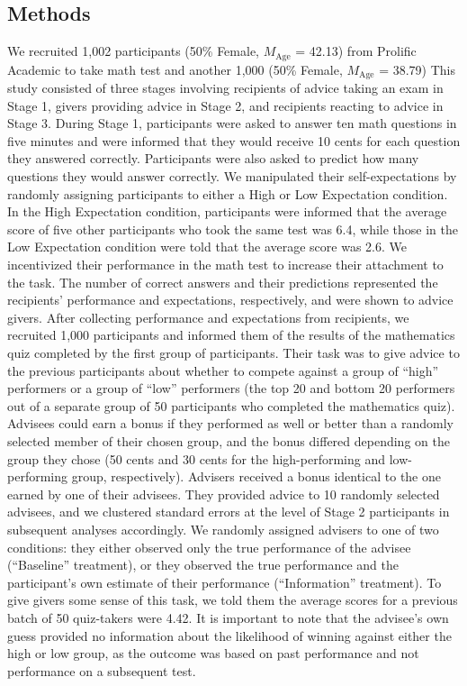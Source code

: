 \documentclass[
  man,floatsintext]{apa6}
\begin{document}
\hypertarget{methods}{%
\subsection{Methods}\label{methods}}

We recruited 1,002 participants (50\% Female, \(M_{\text{Age}}\) = 42.13) from Prolific Academic to take math test and another 1,000 (50\% Female, \(M_{\text{Age}}\) = 38.79)
This study consisted of three stages involving recipients of advice taking an exam in Stage 1, givers providing advice in Stage 2, and recipients reacting to advice in Stage 3. During Stage 1, participants were asked to answer ten math questions in five minutes and were informed that they would receive 10 cents for each question they answered correctly. Participants were also asked to predict how many questions they would answer correctly. We manipulated their self-expectations by randomly assigning participants to either a High or Low Expectation condition. In the High Expectation condition, participants were informed that the average score of five other participants who took the same test was 6.4, while those in the Low Expectation condition were told that the average score was 2.6. We incentivized their performance in the math test to increase their attachment to the task. The number of correct answers and their predictions represented the recipients' performance and expectations, respectively, and were shown to advice givers.
After collecting performance and expectations from recipients, we recruited 1,000 participants and informed them of the results of the mathematics quiz completed by the first group of participants. Their task was to give advice to the previous participants about whether to compete against a group of ``high'' performers or a group of ``low'' performers (the top 20 and bottom 20 performers out of a separate group of 50 participants who completed the mathematics quiz). Advisees could earn a bonus if they performed as well or better than a randomly selected member of their chosen group, and the bonus differed depending on the group they chose (50 cents and 30 cents for the high-performing and low-performing group, respectively). Advisers received a bonus identical to the one earned by one of their advisees. They provided advice to 10 randomly selected advisees, and we clustered standard errors at the level of Stage 2 participants in subsequent analyses accordingly. We randomly assigned advisers to one of two conditions: they either observed only the true performance of the advisee (``Baseline'' treatment), or they observed the true performance and the participant's own estimate of their performance (``Information'' treatment). To give givers some sense of this task, we told them the average scores for a previous batch of 50 quiz-takers were 4.42. It is important to note that the advisee's own guess provided no information about the likelihood of winning against either the high or low group, as the outcome was based on past performance and not performance on a subsequent test.
\end{document}

